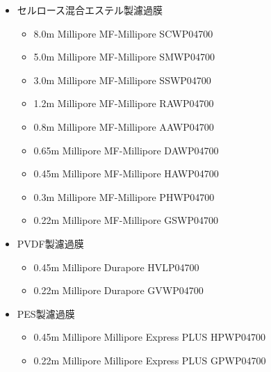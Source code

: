 \documentclass[titlepage,10pt,a4paper,uplatex]{jsbook}
\begin{document}
\begin{itemize}
\begin{itemize}
\begin{itemize}
\item 2.0{\textmu}m Whatman Nuclepore 111111
\item 2.0{\textmu}m Millipore Isopore TTTP04700
\item 1.2{\textmu}m Millipore Isopore RTTP04700
\item 1.0{\textmu}m Whatman Nuclepore 111110
\item 0.8{\textmu}m Millipore Isopore ATTP04700
\item 0.6{\textmu}m Millipore Isopore DTTP04700
\item 0.4{\textmu}m Millipore Isopore HTTP04700
\item 0.22{\textmu}m Millipore Isopore GTTP04700
\end{itemize}
\item セルロース混合エステル製濾過膜
\begin{itemize}
\item 8.0{\textmu}m Millipore MF-Millipore SCWP04700
\item 5.0{\textmu}m Millipore MF-Millipore SMWP04700
\item 3.0{\textmu}m Millipore MF-Millipore SSWP04700
\item 1.2{\textmu}m Millipore MF-Millipore RAWP04700
\item 0.8{\textmu}m Millipore MF-Millipore AAWP04700
\item 0.65{\textmu}m Millipore MF-Millipore DAWP04700
\item 0.45{\textmu}m Millipore MF-Millipore HAWP04700
\item 0.3{\textmu}m Millipore MF-Millipore PHWP04700
\item 0.22{\textmu}m Millipore MF-Millipore GSWP04700
\end{itemize}
\item PVDF製濾過膜
\begin{itemize}
\item 0.45{\textmu}m Millipore Durapore HVLP04700
\item 0.22{\textmu}m Millipore Durapore GVWP04700
\end{itemize}
\item PES製濾過膜
\begin{itemize}
\item 0.45{\textmu}m Millipore Millipore Express PLUS HPWP04700
\item 0.22{\textmu}m Millipore Millipore Express PLUS GPWP04700
\end{itemize}
\end{itemize}
\end{itemize}
\end{document}
